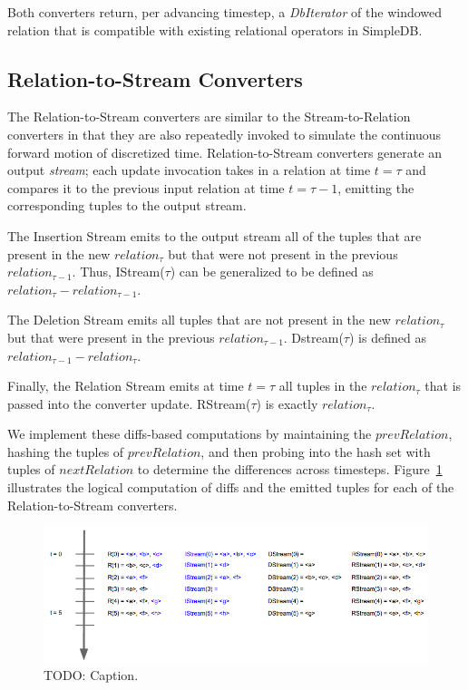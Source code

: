 \documentclass[a4paper, 10pt, conference]{IEEEconf}
\begin{document}
Both converters return, per advancing timestep, a \textit{DbIterator} of the windowed relation that is compatible with existing relational operators in SimpleDB.

\subsection{Relation-to-Stream Converters}
The Relation-to-Stream converters are similar to the Stream-to-Relation converters in that they are also repeatedly invoked to simulate the continuous forward motion of discretized time. Relation-to-Stream converters generate an output \textit{stream}; each update invocation takes in a relation at time $t = \tau$ and compares it to the previous input relation at time $t = \tau - 1$, emitting the corresponding tuples to the output stream. 

The Insertion Stream emits to the output stream all of the tuples that are present in the new $relation_{\tau}$ but that were not present in the previous $relation_{\tau - 1}$. Thus, IStream($\tau$) can be generalized to be defined as $relation_{\tau} -relation_{\tau - 1}$.

The Deletion Stream emits all tuples that are not present in the new $relation_{\tau}$ but that were present in the previous $relation_{\tau - 1}$. Dstream($\tau$) is defined as $relation_{\tau - 1} - relation_{\tau}$.

Finally, the Relation Stream emits at time $t = \tau$ all tuples in the $relation_{\tau}$ that is passed into the converter update. RStream($\tau$) is exactly $relation_{\tau}$.

We implement these diffs-based computations by maintaining the $prevRelation$, hashing the tuples of $prevRelation$, and then probing into the hash set with tuples of $nextRelation$ to determine the differences across timesteps. Figure~\ref{fig:stream_converter} illustrates the logical computation of diffs and the emitted tuples for each of the Relation-to-Stream converters. 

\begin{figure}[tpH]
    \centering
    \centerline{\includegraphics[totalheight=3cm]{stream_converter.png}}
    \caption{TODO: Caption.}
    \label{fig:stream_converter}
\end{figure}
\end{document}
